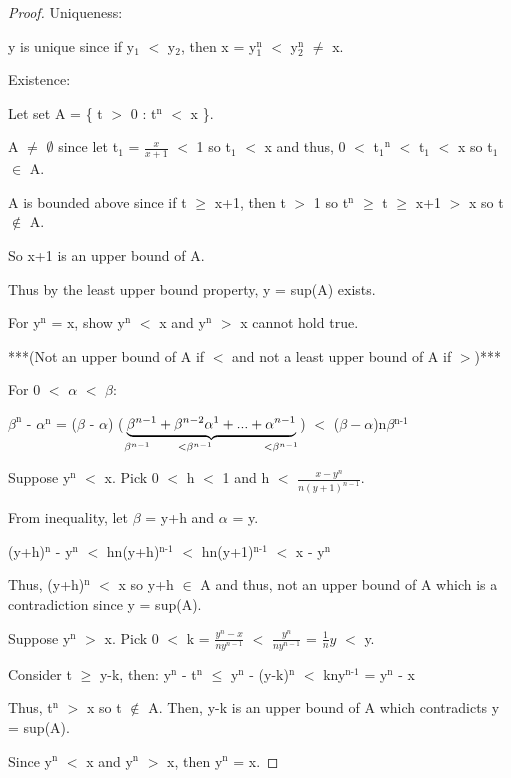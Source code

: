 	\begin{proof}
		{ \color{lgreen} Uniqueness: }

		y is unique since if y$_{1}$ $<$ y$_{2}$, then
		x = y$_{1}^\text{n}$ $<$ y$_{2}^\text{n}$ $\neq$ x.

		{ \color{lgreen} Existence: }

		Let set A = \{ t $>$ 0 : t$^\text{n}$ $<$ x \}.

		A $\not =$ $\emptyset$ since let t$_{1}$ = $\frac{x}{x+1}$ $<$ 1 so t$_1$ $<$ x
		and thus, 0 $<$ t$_{1}$$^\text{n}$ $<$ t$_{1}$ $<$ x so t$_{1}$ $\in$ A.

		A is bounded above since if t $ \geq $ x+1, then
		t $>$ 1 so t$^\text{n}$ $ \geq $ t $ \geq $ x+1 $>$ x so t $\not \in$ A.

		So x+1 is an upper bound of A.

		Thus by the least upper bound property, y = sup(A) exists.

		For y$^\text{n}$ = x, show y$^\text{n}$ $<$ x and
		y$^\text{n}$ $>$ x cannot hold true.

		***(Not an upper bound of A if $<$ and not a least upper bound of A if $>$)***

		For 0 $<$ $\alpha$ $<$ $\beta$:

		\hspace{1cm}
		$\beta ^\text{n}$ - $\alpha^\text{n}$
		= ($\beta$ - $\alpha$) ($\underbrace{\beta^{n-1}
		+ \beta^{n-2}\alpha^1 + ... + \alpha^{n-1}}
		_{\beta^{n-1} \hspace{0.7cm} <\beta^{n-1} \hspace{1.3cm} <\beta^{n-1}}$)
		$<$ ($\beta - \alpha$)n$\beta$$^\text{n-1}$ 

		Suppose y$^\text{n}$ $<$ x. Pick 0 $<$ h $<$ 1 and
		h $<$ $\frac{x-y^n}{n(y+1)^{n-1}}$.

		\hspace{0.5cm}
		From inequality, let $\beta$ = y+h and $\alpha$ = y.

		\hspace{1cm}
		(y+h)$^\text{n}$ - y$^\text{n}$ $<$ hn(y+h)$^\text{n-1}$
		$<$ hn(y+1)$^\text{n-1}$ $<$ x - y$^\text{n}$

		\begin{adjustbox}{minipage=16cm, right, vspace=0.1cm 0cm}
			Thus, (y+h)$^\text{n}$ $<$ x so y+h $\in$ A and thus, not an upper bound of A
			which is a contradiction since y = sup(A).
		\end{adjustbox}

		Suppose y$^\text{n}$ $>$ x.
		Pick 0 $<$ k = $\frac{y^n - x}{ny^{n-1}}$ $<$ $\frac{y^n}{ny^{n-1}}$
		= $\frac{1}{n}y$ $<$ y.

		\hspace{0.5cm}
		Consider t $ \geq $  y-k, then:
		y$^\text{n}$ - t$^\text{n}$ $ \leq $  y$^\text{n}$ - (y-k)$^\text{n}$ $<$
		kny$^\text{n-1}$ = y$^\text{n}$ - x

		\hspace{0.5cm}
		Thus, t$^\text{n}$ $>$ x so t $\not \in$ A.
		Then, y-k is an upper bound of A which contradicts y = sup(A).

		Since y$^\text{n}$ $<$ x and y$^\text{n}$ $>$ x, then y$^\text{n}$ = x.
	\end{proof}

